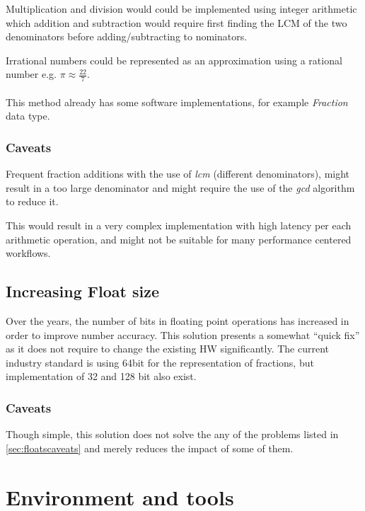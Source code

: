 \documentclass[10pt]{article}
\begin{document}
Multiplication and division would could be implemented using integer arithmetic
which addition and subtraction would require first finding the LCM of the two
denominators before adding/subtracting to nominators.

Irrational numbers could be represented as an approximation using a rational
number e.g. $\pi \approx \frac{22}{7}$.

\paragraph{}
This method already has some software implementations, for example
\textit{Fraction} data type.

\subsubsection{Caveats}\label{sec:caveats}

Frequent fraction additions with the use of \textit{lcm} (different
denominators), might result in a too large denominator and might require the use
of the \textit{gcd} algorithm to reduce it.

This would result in a very complex implementation with high latency per each
arithmetic operation, and might not be suitable for many performance centered workflows.

\subsection{Increasing Float size}\label{sec:increasefloat}

Over the years, the number of bits in floating point operations has increased in
order to improve number accuracy. This solution presents a somewhat ``quick fix''
as it does not require to change the existing HW significantly.
The current industry standard is using 64bit for the representation of
fractions, but implementation of 32 and 128 bit also exist.

\subsubsection{Caveats}\label{sec:caveats-1}

Though simple, this solution does not solve the any of the problems listed in
\autoref{sec:floatscaveats} and merely reduces the impact of some of them.

\section{Environment and tools}\label{sec:environment-tools}
\end{document}
